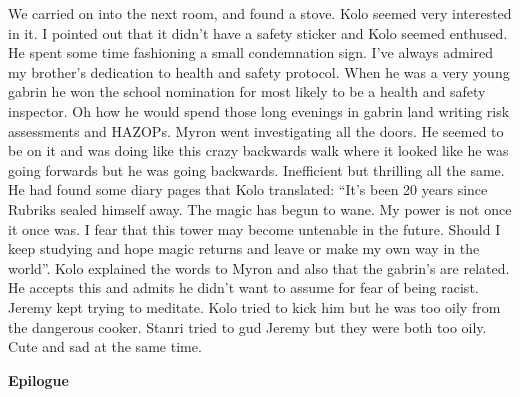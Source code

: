 We carried on into the next room, and found a stove. Kolo seemed very interested in it. I pointed out that it didn’t have a safety sticker and Kolo seemed enthused. He spent some time fashioning a small condemnation sign. I’ve always admired my brother’s dedication to health and safety protocol. When he was a very young gabrin he won the school nomination for most likely to be a health and safety inspector. Oh how he would spend those long evenings in gabrin land writing risk assessments and HAZOPs. Myron went investigating all the doors. He seemed to be on it and was doing like this crazy backwards walk where it looked like he was going forwards but he was going backwards. Inefficient but thrilling all the same. He had found some diary pages that Kolo translated: “It’s been 20 years since Rubriks sealed himself away. The magic has begun to wane. My power is not once it once was. I fear that this tower may become untenable in the future. Should I keep studying and hope magic returns and leave or make my own way in the world”. Kolo explained the words to Myron and also that the gabrin’s are related. He accepts this and admits he didn’t want to assume for fear of being racist. Jeremy kept trying to meditate. Kolo tried to kick him but he was too oily from the dangerous cooker. Stanri tried to gud Jeremy but they were both too oily. Cute and sad at the same time.\medskip

\textbf{Epilogue}\medskip


